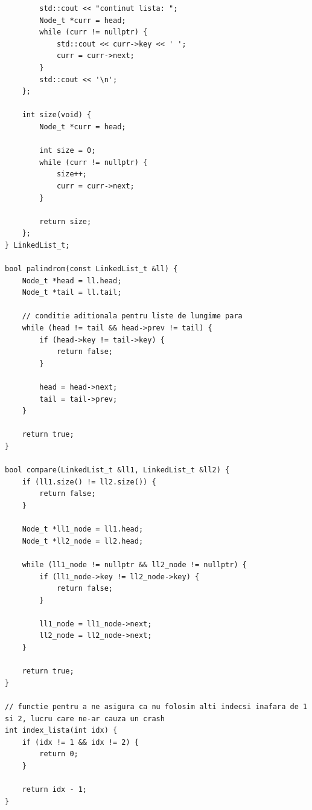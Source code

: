 \documentclass[12pt]{book}
\begin{document}
\begin{lstlisting}
        std::cout << "continut lista: ";
        Node_t *curr = head;
        while (curr != nullptr) {
            std::cout << curr->key << ' ';
            curr = curr->next;
        }
        std::cout << '\n';
    };

    int size(void) {
        Node_t *curr = head;

        int size = 0;
        while (curr != nullptr) {
            size++;
            curr = curr->next;
        }

        return size;
    };
} LinkedList_t;

bool palindrom(const LinkedList_t &ll) {
    Node_t *head = ll.head;
    Node_t *tail = ll.tail;

    // conditie aditionala pentru liste de lungime para
    while (head != tail && head->prev != tail) {
        if (head->key != tail->key) {
            return false;
        }

        head = head->next;
        tail = tail->prev;
    }

    return true;
}

bool compare(LinkedList_t &ll1, LinkedList_t &ll2) {
    if (ll1.size() != ll2.size()) {
        return false;
    }

    Node_t *ll1_node = ll1.head;
    Node_t *ll2_node = ll2.head;

    while (ll1_node != nullptr && ll2_node != nullptr) {
        if (ll1_node->key != ll2_node->key) {
            return false;
        }

        ll1_node = ll1_node->next;
        ll2_node = ll2_node->next;
    }

    return true;
}

// functie pentru a ne asigura ca nu folosim alti indecsi inafara de 1 si 2, lucru care ne-ar cauza un crash
int index_lista(int idx) {
    if (idx != 1 && idx != 2) {
        return 0;
    }

    return idx - 1;
}
\end{lstlisting}

\newpage
\end{document}
